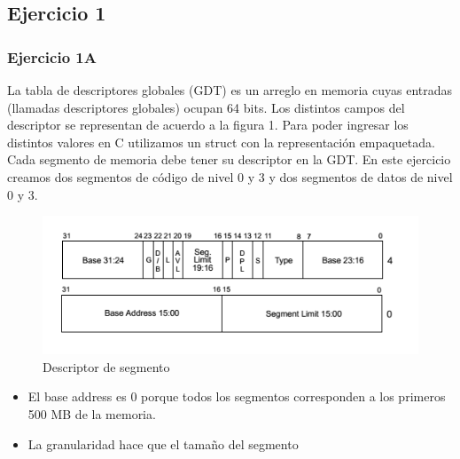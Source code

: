 \subsection{Ejercicio 1}
\subsubsection{Ejercicio 1A}
La tabla de descriptores globales (GDT) es un arreglo en memoria cuyas entradas (llamadas descriptores globales) ocupan 64 bits. Los distintos campos del descriptor se representan de acuerdo a la figura 1. Para poder ingresar los distintos valores en C utilizamos un struct con la representación empaquetada. Cada segmento de memoria debe tener su descriptor en la GDT. En este ejercicio creamos dos segmentos de código de nivel 0 y 3 y dos segmentos de datos de nivel 0 y 3.\newline
\begin{figure}[h]
\centering
\includegraphics[scale=0.6] {descriptor_segmento}
\caption{Descriptor de segmento}
\end{figure}
\begin{itemize}
	\item El base address es 0 porque todos los segmentos corresponden a los primeros 500 MB de la memoria.
	\item La granularidad hace que el tamaño del segmento
\end{itemize}



